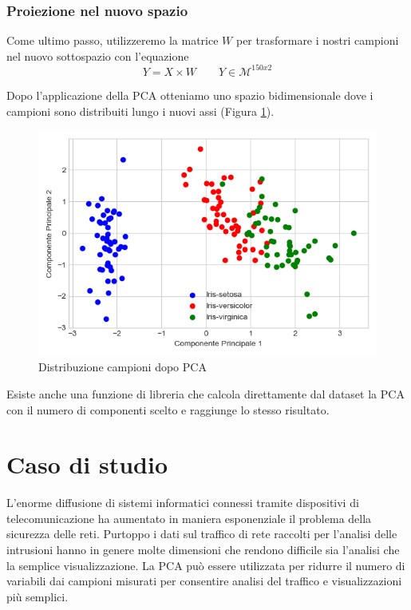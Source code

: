 \documentclass[12pt]{article}
\newcommand{\codice}[2]{}
\newcommand{\sectionline}{
	\begin{center}
		\resizebox{0.5\linewidth}{1ex}{
			\begin{tikzpicture}
			\node  (C) at (0,0) {};
			\node (D) at (9,0) {};
			\path (C) to [ornament=83] (D);
			\end{tikzpicture}
		}
	\end{center}
}
\begin{document}
		\subsubsection{Proiezione nel nuovo spazio}
			Come ultimo passo, utilizzeremo la matrice $W$ per trasformare i nostri campioni nel nuovo sottospazio con l'equazione $$Y = X\times W \qquad Y \in \mathcal{M}^{150x2}$$
			\codice{132}{133}
			Dopo l'applicazione della \ac{PCA} otteniamo uno spazio bidimensionale dove i campioni sono distribuiti lungo i nuovi assi (Figura \ref{img:PCA}).
			\begin{figure}
				\begin{center}
					\includegraphics[scale=.5]{PCA}
					\caption{Distribuzione campioni dopo PCA}
					\label{img:PCA}
				\end{center}
			\end{figure}
			
			Esiste anche una funzione di libreria che calcola direttamente dal dataset la \ac{PCA} con il numero di componenti scelto e raggiunge lo stesso risultato.
			\codice{149}{151}
	\sectionline
			
\section{Caso di studio}
	L'enorme diffusione di sistemi informatici connessi tramite dispositivi di telecomunicazione ha aumentato in maniera esponenziale il problema della sicurezza delle reti. Purtoppo i dati sul traffico di rete raccolti per l'analisi delle intrusioni hanno in genere molte dimensioni che rendono difficile sia l'analisi che la semplice visualizzazione. La \ac{PCA} può essere utilizzata per ridurre il numero di variabili dai campioni misurati per consentire analisi del traffico e visualizzazioni più semplici.
	
\end{document}
